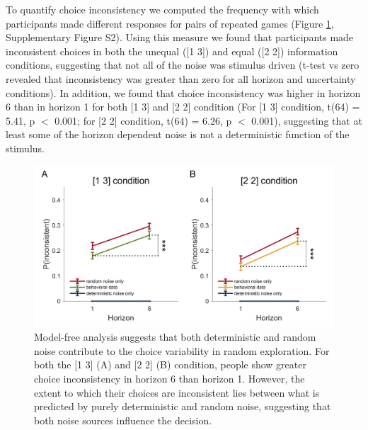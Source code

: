 \documentclass[12pt]{article}
\begin{document}
	To quantify choice inconsistency we computed the frequency with which participants made different responses for pairs of repeated games (Figure \ref{fig:mf2}, Supplementary Figure S2). Using this measure we found that participants made inconsistent choices in both the unequal ([1 3]) and equal ([2 2]) information conditions, suggesting that not all of the noise was stimulus driven (t-test vs zero revealed that inconsistency was greater than zero for all horizon and uncertainty conditions). In addition, we found that choice inconsistency was higher in horizon 6 than in horizon 1 for both [1 3] and [2 2] condition (For [1 3] condition, t(64) = 5.41, p $<$ 0.001; for [2 2] condition, t(64) = 6.26, p $<$ 0.001), suggesting that at least some of the horizon dependent noise is not a deterministic function of the stimulus.
	
	\begin{figure}[H]
		\begin{center}
			\includegraphics[width=\textwidth]{figures/RanDetNoise_pinconsistent.jpg}
			\caption{Model-free analysis suggests that both deterministic and random noise contribute to the choice variability in random exploration. For both the [1 3] (A) and [2 2] (B) condition, people show greater choice inconsistency in horizon 6 than horizon 1. However, the extent to which their choices are inconsistent lies between what is predicted by purely deterministic and random noise, suggesting that both noise sources influence the decision.}
			\label{fig:mf2}
		\end{center}
	\end{figure}
	
\end{document}

